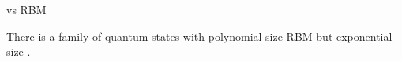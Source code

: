 \begin{frame}{\limdd vs RBM}
\begin{refsection}


\begin{lemma}
	There is a family of quantum states with polynomial-size RBM but exponential-size \limdd.
\end{lemma}

%
%
%
%
%
%
%
%
%
%

\end{refsection}
\end{frame}
